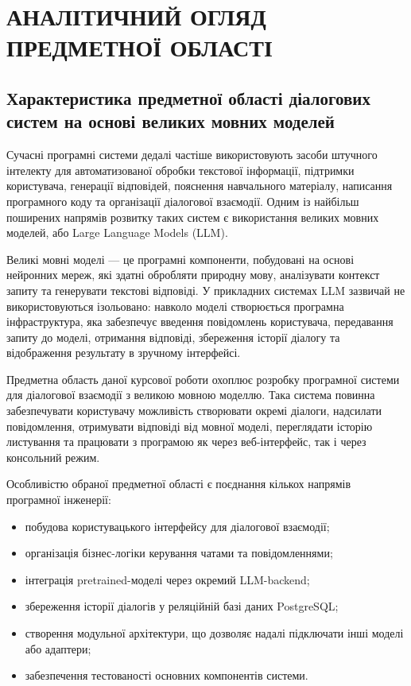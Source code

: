 \section{АНАЛІТИЧНИЙ ОГЛЯД ПРЕДМЕТНОЇ ОБЛАСТІ}

\subsection{Характеристика предметної області діалогових систем на основі великих мовних моделей}

Сучасні програмні системи дедалі частіше використовують засоби штучного інтелекту для автоматизованої обробки текстової інформації, підтримки користувача, генерації відповідей, пояснення навчального матеріалу, написання програмного коду та організації діалогової взаємодії. Одним із найбільш поширених напрямів розвитку таких систем є використання великих мовних моделей, або Large Language Models (LLM).

Великі мовні моделі --- це програмні компоненти, побудовані на основі нейронних мереж, які здатні обробляти природну мову, аналізувати контекст запиту та генерувати текстові відповіді. У прикладних системах LLM зазвичай не використовуються ізольовано: навколо моделі створюється програмна інфраструктура, яка забезпечує введення повідомлень користувача, передавання запиту до моделі, отримання відповіді, збереження історії діалогу та відображення результату в зручному інтерфейсі.

Предметна область даної курсової роботи охоплює розробку програмної системи для діалогової взаємодії з великою мовною моделлю. Така система повинна забезпечувати користувачу можливість створювати окремі діалоги, надсилати повідомлення, отримувати відповіді від мовної моделі, переглядати історію листування та працювати з програмою як через веб-інтерфейс, так і через консольний режим.

Особливістю обраної предметної області є поєднання кількох напрямів програмної інженерії:
\begin{itemize}
  \item побудова користувацького інтерфейсу для діалогової взаємодії;
  \item організація бізнес-логіки керування чатами та повідомленнями;
  \item інтеграція pretrained-моделі через окремий LLM-backend;
  \item збереження історії діалогів у реляційній базі даних PostgreSQL;
  \item створення модульної архітектури, що дозволяє надалі підключати інші моделі або адаптери;
  \item забезпечення тестованості основних компонентів системи.
\end{itemize}


